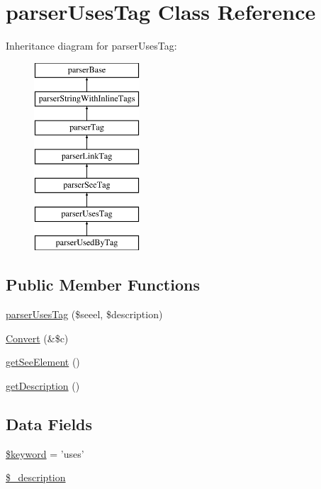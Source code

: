 \hypertarget{classparser_uses_tag}{\section{parser\-Uses\-Tag \-Class \-Reference}
\label{classparser_uses_tag}
}
\-Inheritance diagram for parser\-Uses\-Tag\-:\begin{figure}[H]
\begin{center}
\leavevmode
\includegraphics[height=7.000000cm]{classparser_uses_tag}
\end{center}
\end{figure}
\subsection*{\-Public \-Member \-Functions}
\begin{DoxyCompactItemize}
\item 
\hyperlink{classparser_uses_tag_aee2440da4fdc212d196e39b6c1d37105}{parser\-Uses\-Tag} (\$seeel, \$description)
\item 
\hyperlink{classparser_uses_tag_ad6c06bea9d11cc1c362b592306cfa707}{\-Convert} (\&\$c)
\item 
\hyperlink{classparser_uses_tag_a50a571908126fc3a550f24f0527660bd}{get\-See\-Element} ()
\item 
\hyperlink{classparser_uses_tag_a2e7bb35c71bf1824456ceb944cb7a845}{get\-Description} ()
\end{DoxyCompactItemize}
\subsection*{\-Data \-Fields}
\begin{DoxyCompactItemize}
\item 
\hyperlink{classparser_uses_tag_a4a925d6b38bcf3957c713a7d3dc7da1f}{\$keyword} = 'uses'
\item 
\hyperlink{classparser_uses_tag_a8117a7944266f3283fa6d3526d5b24dc}{\$\-\_\-description}
\end{DoxyCompactItemize}


